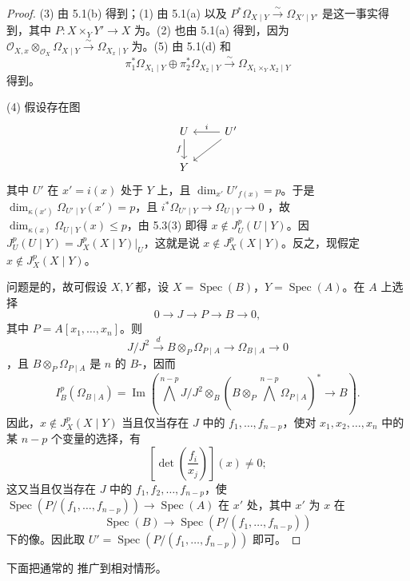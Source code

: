\begin{proof}
(3) 由 5.1(b) 得到；(1) 由 5.1(a) 以及 $P^*\Omega_{X\mid Y}\xrightarrow\sim\Omega_{X'\mid Y'}$ 是这一事实得到，其中 $P:X\times_Y Y'\to X$ 为。(2) 也由 5.1(a) 得到，因为 $\mathcal O_{X,x}\otimes_{\mathcal O_X}\Omega_{X\mid Y}\xrightarrow\sim\Omega_{X_x\mid Y}$ 为。(5) 由 5.1(d) 和
\[
\pi_1^*\Omega_{X_1\mid Y}\oplus\pi_2^*\Omega_{X_2\mid Y}\xrightarrow\sim\Omega_{X_1\times_Y X_2\mid Y}
\]
得到。

(4) 假设存在图
\[
\begin{tikzcd}
U\arrow[d,"f"']&U'\arrow[l,"i"']\arrow[dl]\\
Y&
\end{tikzcd}
\]
其中 $U'$ 在 $x'=i(x)$ 处于 $Y$ 上，且 $\dim_{x'}U'_{f(x)}=p$。于是 $\dim_{\kappa(x')}\Omega_{U'\mid Y}(x')=p$，且 $i^*\Omega_{U'\mid Y}\to\Omega_{U\mid Y}\to0$ ，故 $\dim_{\kappa(x)}\Omega_{U\mid Y}(x)\leq p$，由 5.3(3) 即得 $x\notin J_U^p(U\mid Y)$。因 $J_U^p(U\mid Y)=J_X^p(X\mid Y)|_U$，这就是说 $x\notin J_X^p(X\mid Y)$。反之，现假定 $x\notin J_X^p(X\mid Y)$。

问题是的，故可假设 $X,Y$ 都，设 $X=\operatorname{Spec}(B)$，$Y=\operatorname{Spec}(A)$。在 $A$ 上选择
\[
0\longrightarrow J\longrightarrow P\longrightarrow B\longrightarrow0,
\]
其中 $P=A[x_1,\ldots,x_n]$。则
\[
J/J^2\xrightarrow d B\otimes_P\Omega_{P\mid A}\longrightarrow\Omega_{B\mid A}\longrightarrow0
\]
，且 $B\otimes_P\Omega_{P\mid A}$ 是 $n$ 的 $B$-，因而
\[
I_B^p(\Omega_{B\mid A})=
\operatorname{Im}\left(\bigwedge^{n-p}J/J^2\otimes_B
\left(B\otimes_P\bigwedge^{n-p}\Omega_{P\mid A}\right)^*\longrightarrow B\right).
\]
因此，$x\notin J_X^p(X\mid Y)$ 当且仅当存在 $J$ 中的 $f_1,\ldots,f_{n-p}$，使对 $x_1,x_2,\ldots,x_n$ 中的某 $n-p$ 个变量的选择，有
\[
\left[\det\left(\frac{f_i}{x_j}\right)\right](x)\ne0;
\]
这又当且仅当存在 $J$ 中的 $f_1,f_2,\ldots,f_{n-p}$，使
$\operatorname{Spec}(P/(f_1,\ldots,f_{n-p}))\to\operatorname{Spec}(A)$ 在 $x'$ 处，其中 $x'$ 为 $x$ 在
\[
\operatorname{Spec}(B)\longrightarrow\operatorname{Spec}(P/(f_1,\ldots,f_{n-p}))
\]
下的像。因此取 $U'=\operatorname{Spec}(P/(f_1,\ldots,f_{n-p}))$ 即可。
\end{proof}

下面把通常的 推广到相对情形。

